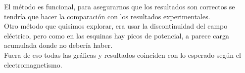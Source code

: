 El método es funcional, para asegurarnos que los resultados son correctos se tendría que hacer la comparación con los resultados experimentales. \\
Otro método que quisimos explorar, era usar la discontinuidad del campo eléctrico, pero como en las esquinas hay picos de potencial, a parece carga acumulada donde no debería haber.\\
Fuera de eso todas las gráficas y resultados coinciden con lo esperado según el electromagnetismo. 